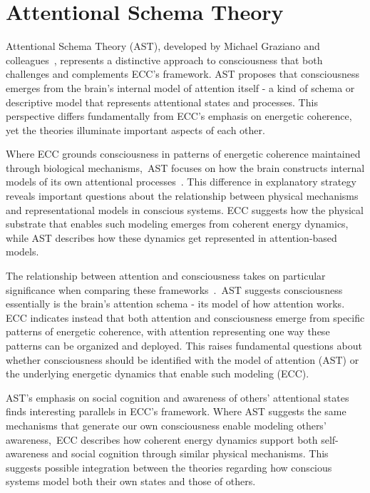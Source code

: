 \section{Attentional Schema Theory}

Attentional Schema Theory (AST), developed by Michael Graziano and colleagues~\cite{Graziano2013, Graziano2019}, represents a distinctive approach to consciousness that both challenges and complements ECC's framework. AST proposes that consciousness emerges from the brain's internal model of attention itself - a kind of schema or descriptive model that represents attentional states and processes. This perspective differs fundamentally from ECC's emphasis on energetic coherence, yet the theories illuminate important aspects of each other.

Where ECC grounds consciousness in patterns of energetic coherence maintained through biological mechanisms,~AST focuses on how the brain constructs internal models of its own attentional processes~\cite{Graziano2011, GrazianoWebb2015}. This difference in explanatory strategy reveals important questions about the relationship between physical mechanisms and representational models in conscious systems. ECC suggests how the physical substrate that enables such modeling emerges from coherent energy dynamics, while AST describes how these dynamics get represented in attention-based models.

The relationship between attention and consciousness takes on particular significance when comparing these frameworks~\cite{GrazianoWebb2015, Webb2016}.~AST suggests consciousness essentially is the brain's attention schema - its model of how attention works. ECC indicates instead that both attention and consciousness emerge from specific patterns of energetic coherence, with attention representing one way these patterns can be organized and deployed. This raises fundamental questions about whether consciousness should be identified with the model of attention (AST) or the underlying energetic dynamics that enable such modeling (ECC).

AST's emphasis on social cognition and awareness of others' attentional states~\cite{Kelly2014, Kelly2016} finds interesting parallels in ECC's framework. Where AST suggests the same mechanisms that generate our own consciousness enable modeling others' awareness,~ECC describes how coherent energy dynamics support both self-awareness and social cognition through similar physical mechanisms. This suggests possible integration between the theories regarding how conscious systems model both their own states and those of others.

